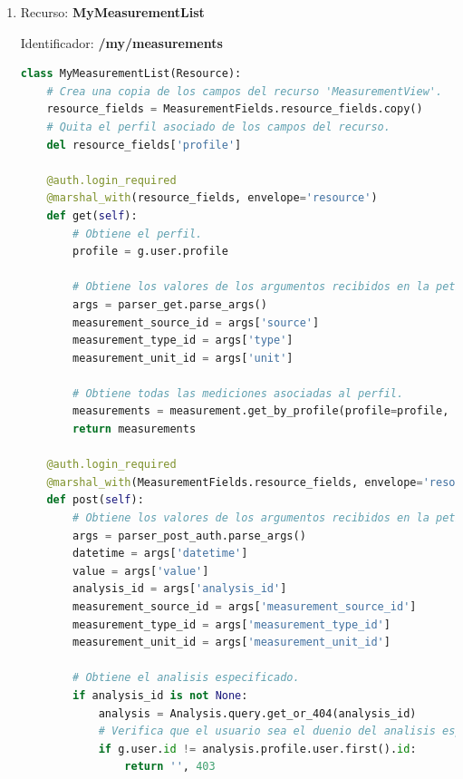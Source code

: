\begin{enumerate}
\begin{lstlisting}[language=Python]
    @auth.login_required
    @marshal_with(resource_fields, envelope='resource')
    def get(self):
        # Obtiene el perfil.
        profile = g.user.profile

        # Obtiene las ultimas mediciones asociadas al perfil.
        latest_measurements = measurement.get_latest_by_profile(profile)
        return latest_measurements
\end{lstlisting}

\item Recurso: \textbf{MyMeasurementList}

Identificador: \textbf{/my/measurements}

\begin{lstlisting}[language=Python]
class MyMeasurementList(Resource):
    # Crea una copia de los campos del recurso 'MeasurementView'.
    resource_fields = MeasurementFields.resource_fields.copy()
    # Quita el perfil asociado de los campos del recurso.
    del resource_fields['profile']

    @auth.login_required
    @marshal_with(resource_fields, envelope='resource')
    def get(self):
        # Obtiene el perfil.
        profile = g.user.profile

        # Obtiene los valores de los argumentos recibidos en la peticion.
        args = parser_get.parse_args()
        measurement_source_id = args['source']
        measurement_type_id = args['type']
        measurement_unit_id = args['unit']

        # Obtiene todas las mediciones asociadas al perfil.
        measurements = measurement.get_by_profile(profile=profile, source_id=measurement_source_id, type_id=measurement_type_id, unit_id=measurement_unit_id)
        return measurements

    @auth.login_required
    @marshal_with(MeasurementFields.resource_fields, envelope='resource')
    def post(self):
        # Obtiene los valores de los argumentos recibidos en la peticion.
        args = parser_post_auth.parse_args()
        datetime = args['datetime']
        value = args['value']
        analysis_id = args['analysis_id']
        measurement_source_id = args['measurement_source_id']
        measurement_type_id = args['measurement_type_id']
        measurement_unit_id = args['measurement_unit_id']

        # Obtiene el analisis especificado.
        if analysis_id is not None:
            analysis = Analysis.query.get_or_404(analysis_id)
            # Verifica que el usuario sea el duenio del analisis especificado.
            if g.user.id != analysis.profile.user.first().id:
                return '', 403


\end{lstlisting}
\end{enumerate}
